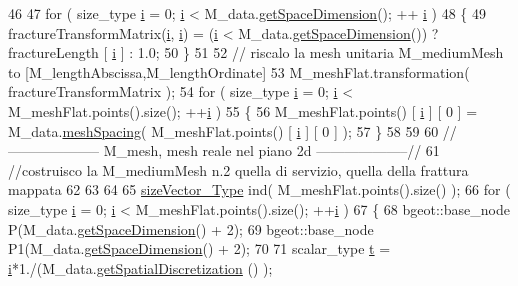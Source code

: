 \begin{DoxyCode}
46 
47     \textcolor{keywordflow}{for} ( size\_type \hyperlink{god__e_8m_a8604be5925f4266ab5ccc69675329c80}{i} = 0; \hyperlink{god__e_8m_a8604be5925f4266ab5ccc69675329c80}{i} < M\_data.\hyperlink{classFractureData_a4b310767d1a91b0cef404093aacfab82}{getSpaceDimension}(); ++
      \hyperlink{god__e_8m_a8604be5925f4266ab5ccc69675329c80}{i} )
48     \{
49         fractureTransformMatrix(\hyperlink{god__e_8m_a8604be5925f4266ab5ccc69675329c80}{i}, \hyperlink{god__e_8m_a8604be5925f4266ab5ccc69675329c80}{i}) = (\hyperlink{god__e_8m_a8604be5925f4266ab5ccc69675329c80}{i} < M\_data.\hyperlink{classFractureData_a4b310767d1a91b0cef404093aacfab82}{getSpaceDimension}()) ? 
      fractureLength [ \hyperlink{god__e_8m_a8604be5925f4266ab5ccc69675329c80}{i} ] : 1.0;
50     \}
51 
52     \textcolor{comment}{// riscalo la mesh unitaria M\_mediumMesh to [M\_lengthAbscissa,M\_lengthOrdinate]}
53     M\_meshFlat.transformation( fractureTransformMatrix );
54     \textcolor{keywordflow}{for} ( size\_type \hyperlink{god__e_8m_a8604be5925f4266ab5ccc69675329c80}{i} = 0; \hyperlink{god__e_8m_a8604be5925f4266ab5ccc69675329c80}{i} < M\_meshFlat.points().size(); ++\hyperlink{god__e_8m_a8604be5925f4266ab5ccc69675329c80}{i} )
55     \{
56         M\_meshFlat.points() [ \hyperlink{god__e_8m_a8604be5925f4266ab5ccc69675329c80}{i} ] [ 0 ] = M\_data.\hyperlink{classFractureData_ab79d66dd830b6e1c55ade0d940c5c8cf}{meshSpacing}( M\_meshFlat.points() [ 
      \hyperlink{god__e_8m_a8604be5925f4266ab5ccc69675329c80}{i} ] [ 0 ] );
57     \}
58 
59 
60     \textcolor{comment}{//-------------------- M\_mesh, mesh reale nel piano 2d --------------------//}
61     \textcolor{comment}{//costruisco la M\_mediumMesh n.2 quella di servizio, quella della frattura mappata}
62 
63 
64 
65     \hyperlink{Core_8h_a83c51913d041a5001e8683434c09857f}{sizeVector\_Type} ind( M\_meshFlat.points().size() );
66     \textcolor{keywordflow}{for} ( size\_type \hyperlink{god__e_8m_a8604be5925f4266ab5ccc69675329c80}{i} = 0; \hyperlink{god__e_8m_a8604be5925f4266ab5ccc69675329c80}{i} < M\_meshFlat.points().size(); ++\hyperlink{god__e_8m_a8604be5925f4266ab5ccc69675329c80}{i} )
67     \{
68         bgeot::base\_node P(M\_data.\hyperlink{classFractureData_a4b310767d1a91b0cef404093aacfab82}{getSpaceDimension}() + 2);
69         bgeot::base\_node P1(M\_data.\hyperlink{classFractureData_a4b310767d1a91b0cef404093aacfab82}{getSpaceDimension}() + 2);
70 
71         scalar\_type \hyperlink{discontinuo_8m_aaccc9105df5383111407fd5b41255e23}{t} = \hyperlink{god__e_8m_a8604be5925f4266ab5ccc69675329c80}{i}*1./(M\_data.\hyperlink{classFractureData_aeb3c6a78af1e2746bf5ce69c9ae8945d}{getSpatialDiscretization} () );

\end{DoxyCode}
